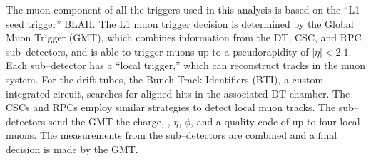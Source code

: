 The muon component of all the triggers used in this analysis is based on the
``L1 seed trigger'' BLAH.  The L1 muon trigger decision is
determined by the Global Muon Trigger (GMT), which combines information from the DT,
CSC, and RPC sub--detectors, and is able to trigger muons up to a pseudorapidity
of $|\eta| < 2.1$.  Each sub--detector has a ``local trigger,'' which can
reconstruct tracks in the muon  system.  For the drift tubes, the Bunch Track
Identifiers (BTI), a custom integrated circuit, searches for aligned hits in the
associated DT chamber.  The CSCs and RPCs employ similar strategies to detect
local muon tracks.  The sub--detectors send the GMT the charge, \pt,
$\eta$, $\phi$, and a quality code of up to four local muons.  The 
measurements from the sub--detectors are combined and a final decision is made
by the GMT.

\ifx\master\undefined\fi
